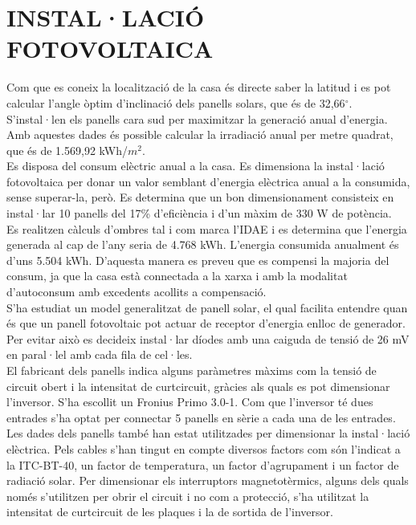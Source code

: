 \chapter{\uppercase{Instal·lació fotovoltaica}}


Com que es coneix la localització de la casa és directe saber la latitud i es pot calcular l'angle òptim d'inclinació dels panells solars, que és de 32,66$^{\circ}$. S'instal·len els panells cara sud per maximitzar la generació anual d'energia. Amb aquestes dades és possible calcular la irradiació anual per metre quadrat, que és de 1.569,92 kWh/$m^2$. \\
\newline Es disposa del consum elèctric anual a la casa. Es dimensiona la instal·lació fotovoltaica per donar un valor semblant d'energia elèctrica anual a la consumida, sense superar-la, però. Es determina que un bon dimensionament consisteix en instal·lar 10 panells del 17\% d'eficiència i d'un màxim de 330 W de potència.\\
\newline Es realitzen càlculs d'ombres tal i com marca l'IDAE i es determina que l'energia generada al cap de l'any seria de 4.768 kWh. L'energia consumida anualment és d'uns 5.504 kWh. D'aquesta manera es preveu que es compensi la majoria del consum, ja que la casa està connectada a la xarxa i amb la modalitat d'autoconsum amb excedents acollits a compensació.\\
\newline S'ha estudiat un model generalitzat de panell solar, el qual facilita entendre quan és que un panell fotovoltaic pot actuar de receptor d'energia enlloc de generador. Per evitar això es decideix instal·lar díodes amb una caiguda de tensió de 26 mV en paral·lel amb cada fila de cel·les.\\
\newline El fabricant dels panells indica alguns paràmetres màxims com la tensió de circuit obert i la intensitat de curtcircuit, gràcies als quals es pot dimensionar l'inversor. S'ha escollit un Fronius Primo 3.0-1. Com que l'inversor té dues entrades s'ha optat per connectar 5 panells en sèrie a cada una de les entrades.\\
\newline Les dades dels panells també han estat utilitzades per dimensionar la instal·lació elèctrica. Pels cables s'han tingut en compte diversos factors com són l'indicat a la ITC-BT-40, un factor de temperatura, un factor d'agrupament i un factor de radiació solar. Per dimensionar els interruptors magnetotèrmics, alguns dels quals només s'utilitzen per obrir el circuit i no com a protecció, s'ha utilitzat la intensitat de curtcircuit de les plaques i la de sortida de l'inversor.




\clearpage


